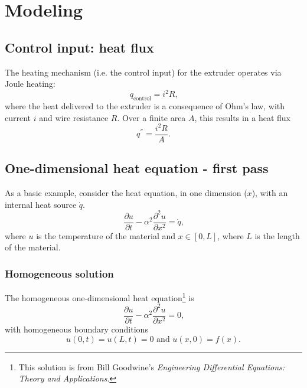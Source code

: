 \documentclass{article}
\makeatletter
\newcommand*{\ie}{i.e.\@\xspace}
\makeatother
\begin{document}
\section[Modeling]{Modeling}
\subsection[Control input: heat flux]{Control input: heat flux}
The heating mechanism (\ie the control input) for the extruder operates via Joule heating: 
\begin{equation}
q_{\textrm{control}} = i^2 R\text{,} 
\end{equation}
where the heat delivered to the extruder is a consequence of Ohm's law, with current $i$ and wire resistance $R$.
Over a finite area $A$, this results in a heat flux
\begin{equation}
q^{''} = \frac{i^2 R}{A}\text{.}
\end{equation}

\subsection[One-dimensional heat equation - first pass]{One-dimensional heat equation - first pass}
As a basic example, consider the heat equation, in one dimension ($x$), with an internal heat source $\dot{q}$.
\begin{equation}
\frac{\partial u}{\partial t} - \alpha^2\frac{\partial^2 u}{\partial x^2} = \dot{q}\text{,}
\end{equation}
where $u$ is the temperature of the material and $x \in \left[0,L\right]$, where $L$ is the length of the material.

\subsubsection{Homogeneous solution}
The homogeneous one-dimensional heat equation\footnote{This solution is from Bill Goodwine's \textit{Engineering Differential Equations: Theory and Applications}.} is
\begin{equation}
\frac{\partial u}{\partial t} - \alpha^2\frac{\partial^2 u}{\partial x^2} = 0\text{,}
\end{equation}
with homogeneous boundary conditions
\begin{equation}
u(0,t) = u(L,t) = 0\text{ and }u(x,0) = f(x)\text{.}
\end{equation}
\end{document}
